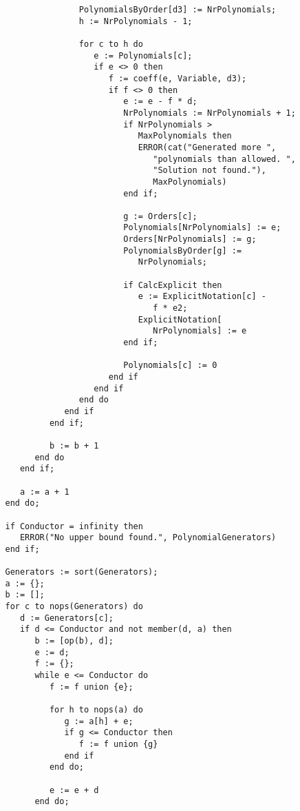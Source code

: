 \begin{verbatim}
                  PolynomialsByOrder[d3] := NrPolynomials;
                  h := NrPolynomials - 1;

                  for c to h do
                     e := Polynomials[c];
                     if e <> 0 then
                        f := coeff(e, Variable, d3);
                        if f <> 0 then
                           e := e - f * d;
                           NrPolynomials := NrPolynomials + 1;
                           if NrPolynomials > 
                              MaxPolynomials then
                              ERROR(cat("Generated more ",
                                 "polynomials than allowed. ",
                                 "Solution not found."),
                                 MaxPolynomials)
                           end if;

                           g := Orders[c];
                           Polynomials[NrPolynomials] := e;
                           Orders[NrPolynomials] := g;
                           PolynomialsByOrder[g] := 
                              NrPolynomials;

                           if CalcExplicit then
                              e := ExplicitNotation[c] - 
                                 f * e2;
                              ExplicitNotation[
                                 NrPolynomials] := e
                           end if;

                           Polynomials[c] := 0
                        end if
                     end if
                  end do
               end if
            end if;

            b := b + 1
         end do
      end if;

      a := a + 1
   end do;

   if Conductor = infinity then
      ERROR("No upper bound found.", PolynomialGenerators)
   end if;

   Generators := sort(Generators);
   a := {};
   b := [];
   for c to nops(Generators) do
      d := Generators[c];
      if d <= Conductor and not member(d, a) then
         b := [op(b), d];
         e := d;
         f := {};
         while e <= Conductor do
            f := f union {e};

            for h to nops(a) do
               g := a[h] + e;
               if g <= Conductor then 
                  f := f union {g}
               end if
            end do;

            e := e + d
         end do;


\end{verbatim}
